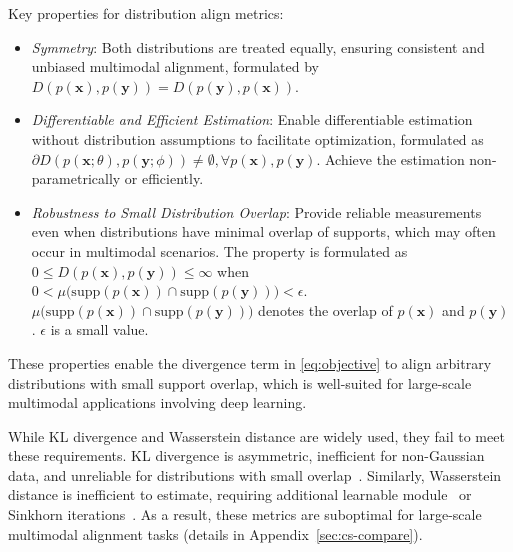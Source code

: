 \begin{remark}
    Key properties for distribution align metrics:
    \begin{itemize}
        \item 
        \vspace{-3mm}
        \textit{Symmetry}: Both distributions are treated equally, ensuring consistent and unbiased multimodal alignment, formulated by  \(D(p(\mathbf{x}), p(\mathbf{y})) = D(p(\mathbf{y}), p(\mathbf{x}))\).  
        
        \item 
        \vspace{-1mm}
        \textit{Differentiable and Efficient Estimation}: 
        Enable differentiable estimation without distribution assumptions to facilitate optimization, formulated as $ \partial D(p(\mathbf{x}; \theta), p(\mathbf{y}; \phi)) \neq \emptyset, \forall p(\mathbf{x}), p(\mathbf{y})$. Achieve the estimation non-parametrically or efficiently.
        
        \item 
        \vspace{-1mm}\textit{Robustness to Small Distribution Overlap}: 
        Provide reliable measurements even when distributions have minimal overlap of supports, which may often occur in multimodal scenarios. The property is formulated as
        \(0 \leq D(p(\mathbf{x}), p(\mathbf{y})) \leq \infty\) when \(0 < \mu \big(\text{supp}(p(\mathbf{x})) \cap \text{supp}(p(\mathbf{y}))\big) < \epsilon\). $\mu\big(\text{supp}(p(\mathbf{x})) \cap \text{supp}(p(\mathbf{y}))\big)$ denotes the overlap of $p(\mathbf{\mathbf{x}})$ and $p(\mathbf{\mathbf{y}})$. $\epsilon$ is a small value. 
        \vspace{-6mm}
    \end{itemize}
\end{remark}

These properties enable the divergence term in \eqref{eq:objective} to align arbitrary distributions with small support overlap, which is well-suited for large-scale multimodal applications involving deep learning. 

While KL divergence and Wasserstein distance are widely used, they fail to meet these requirements. KL divergence is asymmetric, inefficient for non-Gaussian data, and unreliable for distributions with small overlap~\citep{yu2024cauchy}. Similarly, Wasserstein distance is inefficient to estimate, requiring additional learnable module~\citep{arjovsky2017wasserstein} or Sinkhorn iterations~\citep{cuturi2013sinkhorn}. As a result, these metrics are suboptimal for large-scale multimodal alignment tasks (details in Appendix~\ref{sec:cs-compare}).

